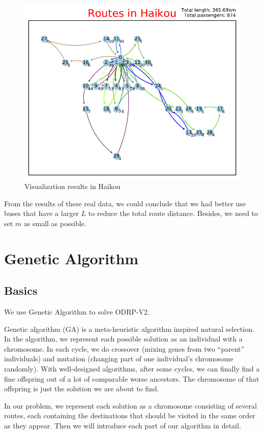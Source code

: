 \documentclass{llncs}
\begin{document}
\begin{figure}
{\begin{minipage}[t]{0.32\textwidth}
				\centering
				\includegraphics[width=\textwidth]{CVRP_haikou_100_30.pdf}
		\end{minipage}}
		\caption{Visualization results in Haikou}\label{opt_haikou}
	\end{figure}

    From the results of these real data, we could conclude that we had better use buses that have a larger $L$ to reduce the total route distance. Besides, we need to set $m$ as small as possible. 

\section{Genetic Algorithm}

\subsection{Basics}
We use Genetic Algorithm to solve ODRP-V2.

Genetic algorithm (GA) is a meta-heuristic algorithm inspired natural selection. In the algorithm, we represent each possible solution as an  individual with a chromosome. In each cycle, we do crossover (mixing genes from two ``parent'' individuals) and mutation (changing part of one individual's chromosome randomly). With well-designed algorithms, after some cycles, we can finally find a fine offspring out of a lot of comparable worse ancestors. The chromosome of that offspring is just the solution we are about to find.

In our problem, we represent each solution as a chromosome consisting of several routes, each containing the destinations that should be visited in the same order as they appear. Then we will introduce each part of our algorithm in detail.
\end{document}
